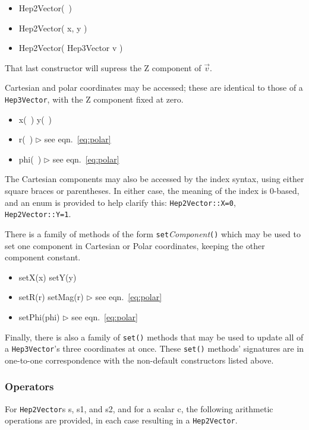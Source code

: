 \documentclass[twoside,12pt]{article}
\def \SV {{\tt Hep3Vector}}
\newcommand {\see}[1] {\hfill$\triangleright$ see eqn.~#1}
\newenvironment{shortlist}{%
\begin{itemize}
\setlength{\itemsep}{0pt}
\setlength{\parskip}{0pt}
}{%
\end{itemize}
}
\begin{document}
\begin{shortlist}
  \item Hep2Vector(~)
  \item Hep2Vector( x, y ) 
  \item Hep2Vector( Hep3Vector v ) 
\end{shortlist}

\noindent
That last constructor will supress the Z component of $\vec{v}$.

Cartesian and polar coordinates may be accessed; these are identical to those 
of a \SV, with the Z component fixed at zero.  

\begin{shortlist}
  \item x(~) \/\/\/ y(~) 
  \item r(~) \see{\ref{eq:polar}}
  \item phi(~) \see{\ref{eq:polar}}
\end{shortlist}

\noindent
The Cartesian components may also be accessed by the index syntax, 
using either square braces or parentheses.  
In either case, the meaning of the index is 0-based, 
and an enum is provided to help clarify this: {\tt Hep2Vector::X=0},
{\tt Hep2Vector::Y=1}.

\noindent
There is a family of methods of the form
{\tt set}{\it Component}{\tt ()} which may be used to set 
one component in Cartesian or Polar coordinates, keeping the other
component constant.  

\begin{shortlist}
  \item setX(x) \/\/\/ setY(y) 
  \item setR(r) \/\/\/ setMag(r) \see{\ref{eq:polar}}
  \item setPhi(phi) 		 \see{\ref{eq:polar}}
\end{shortlist}

\noindent
Finally, there is also a family of {\tt set()} methods
that may be used to update all of a \SV 's three coordinates at once.
These {\tt set()} methods' signatures are in one-to-one correspondence
with the non-default constructors listed above.

\subsubsection{Operators}

For {\tt Hep2Vector}s s, s1, and s2, and for a scalar c,
the following arithmetic operations are provided,
in each case resulting in a {\tt Hep2Vector}.
\end{document}
